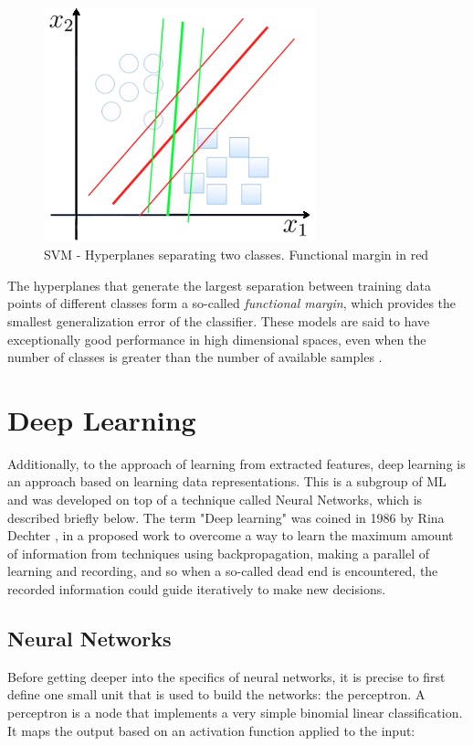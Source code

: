 \begin{figure}[!htb]
    \centering
      \includegraphics[width=0.7\textwidth]{figures/svm}
      \caption{\ac{SVM} - Hyperplanes separating two classes. Functional margin in red}
      \label{fig:svm}
\end{figure}
The hyperplanes that generate the largest separation between training data points of different classes form a so-called \emph{functional margin}, which provides the smallest generalization error of the classifier. These models are said to have exceptionally good performance in high dimensional spaces, even when the number of classes is greater than the number of available samples \cite{SKLEARN}.

\section{Deep Learning}
Additionally, to the approach of learning from extracted features, deep learning is an approach based on learning data representations. This is a subgroup of \ac{ML} and was developed on top of a technique called Neural Networks, which is described briefly below. The term "Deep learning" was coined in 1986 by Rina Dechter \cite{Dechter}, in a proposed work to overcome a way to learn the maximum amount of information from techniques using backpropagation, making a parallel of learning and recording, and so when a so-called dead end is encountered, the recorded information could guide iteratively to make new decisions.

\subsection{Neural Networks}\label{ch:neural}
Before getting deeper into the specifics of neural networks, it is precise to first define one small unit that is used to build the networks: the perceptron. A perceptron is a node that implements a very simple binomial linear classification. It maps the output based on an activation function applied to the input:

